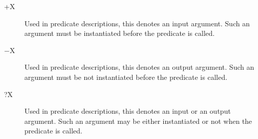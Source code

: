 \begin{description}
\item[+X]
Used in predicate descriptions, this denotes an input argument.
Such an argument must be instantiated before the predicate is called.

\item[$-$X]
Used in predicate descriptions, this denotes an output argument.
Such an argument must be not instantiated before the predicate is called.

\item[?X]
Used in predicate descriptions, this denotes an input or an output argument.
Such an argument may be either 
instantiated or not when the predicate is called.

\end{description}

